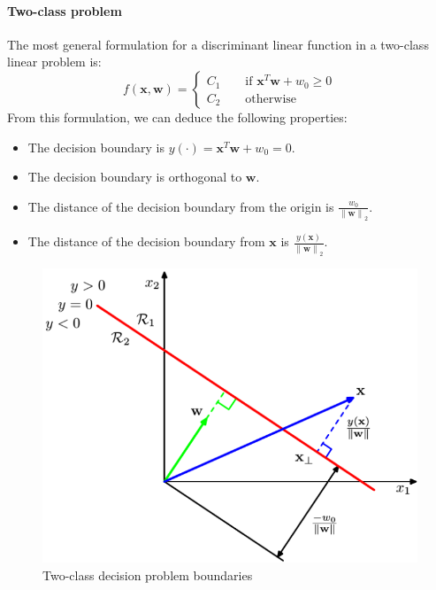 \paragraph*{Two-class problem}
The most general formulation for a discriminant linear function in a two-class linear problem is:
\[f(\textbf{x},\textbf{w})=\begin{cases}
    C_1 \qquad \text{if } \textbf{x}^T\textbf{w}+w_0 \geq 0 \\
    C_2 \qquad \text{otherwise}
\end{cases}\]
From this formulation, we can deduce the following properties:
\begin{itemize}
    \item The decision boundary is $y(\cdot)=\textbf{x}^T\textbf{w}+w_0=0$. 
    \item The decision boundary is orthogonal to $\textbf{w}$. 
    \item The distance of the decision boundary from the origin is $\frac{w_0}{{\left\lVert \textbf{w}\right\rVert}_2 }$.
    \item The distance of the decision boundary from $\textbf{x}$ is $\frac{y(\textbf{x})}{{\left\lVert \textbf{w}\right\rVert}_2 }$.
\end{itemize}
\begin{figure}[H]
    \centering
    \includegraphics[width=0.35\linewidth]{images/2c.png}
    \caption{Two-class decision problem boundaries}
\end{figure}

